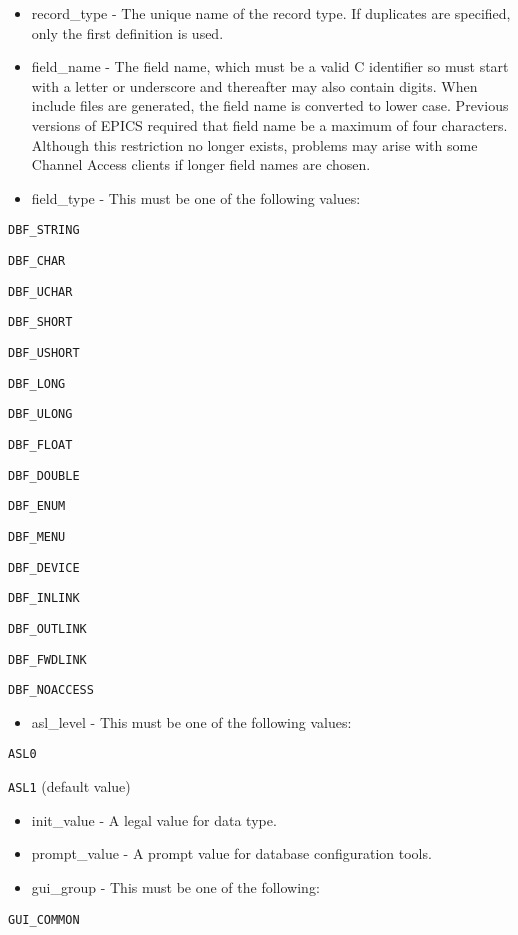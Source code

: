 \begin{itemize}\item {}record\_type - The unique name of the record type. If duplicates are specified, only the first definition is used.

\item {}field\_name - The field name, which must be a valid C identifier so must start with a letter or underscore and 
thereafter may also contain digits. When include files are generated, the field name is converted to lower case. 
Previous versions of EPICS required that field name be a maximum of four characters. Although this restriction  no 
longer exists, problems may arise with some Channel Access clients if longer field names are chosen.

\item {}field\_type - This must be one of the following values:

\end{itemize}\verb|DBF_STRING|

\verb|DBF_CHAR|

\verb|DBF_UCHAR|

\verb|DBF_SHORT|

\verb|DBF_USHORT|

\verb|DBF_LONG|

\verb|DBF_ULONG|

\verb|DBF_FLOAT|

\verb|DBF_DOUBLE|

\verb|DBF_ENUM|

\verb|DBF_MENU|

\verb|DBF_DEVICE|

\verb|DBF_INLINK|

\verb|DBF_OUTLINK|

\verb|DBF_FWDLINK|

\verb|DBF_NOACCESS|

\begin{itemize}\item {}asl\_level - This must be one of the following values:

\end{itemize}\verb|ASL0|

\verb|ASL1|  (default value)

\begin{itemize}\item {}init\_value - A legal value for data type.

\item {}prompt\_value - A prompt value for database configuration tools.

\item {}gui\_group - This must be one of the following:

\end{itemize}\verb|GUI_COMMON|

